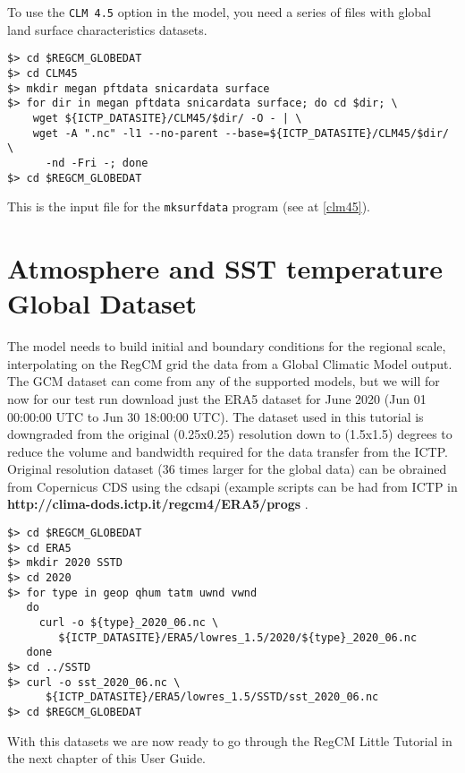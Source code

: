 To use the \verb=CLM 4.5= option in the model, you need a series of files
with global land surface characteristics datasets.

\begin{Verbatim}
$> cd $REGCM_GLOBEDAT
$> cd CLM45
$> mkdir megan pftdata snicardata surface
$> for dir in megan pftdata snicardata surface; do cd $dir; \
    wget ${ICTP_DATASITE}/CLM45/$dir/ -O - | \
    wget -A ".nc" -l1 --no-parent --base=${ICTP_DATASITE}/CLM45/$dir/ \
      -nd -Fri -; done
$> cd $REGCM_GLOBEDAT
\end{Verbatim}

This is the input file for the \verb=mksurfdata= program (see at \ref{clm45}).

\section{Atmosphere and SST temperature Global Dataset}

The model needs to build initial and boundary conditions for the regional scale,
interpolating on the RegCM grid the data from a Global Climatic Model output.
The GCM dataset can come from any of the supported models, but we will for now
for our test run download just the ERA5 dataset for June 2020
(Jun 01 00:00:00 UTC to Jun 30 18:00:00 UTC). The dataset used in this tutorial
is downgraded from the original (0.25x0.25) resolution down to (1.5x1.5) degrees
to reduce the volume and bandwidth required for the data transfer from the
ICTP. Original resolution dataset (36 times larger for the global data) can be
obrained from Copernicus CDS using the cdsapi (example scripts can be had
from ICTP in {\bf http://clima-dods.ictp.it/regcm4/ERA5/progs }.

\begin{Verbatim}
$> cd $REGCM_GLOBEDAT
$> cd ERA5
$> mkdir 2020 SSTD
$> cd 2020
$> for type in geop qhum tatm uwnd vwnd
   do
     curl -o ${type}_2020_06.nc \
        ${ICTP_DATASITE}/ERA5/lowres_1.5/2020/${type}_2020_06.nc
   done
$> cd ../SSTD
$> curl -o sst_2020_06.nc \
      ${ICTP_DATASITE}/ERA5/lowres_1.5/SSTD/sst_2020_06.nc
$> cd $REGCM_GLOBEDAT
\end{Verbatim}

With this datasets we are now ready to go through the RegCM Little Tutorial
in the next chapter of this User Guide.

